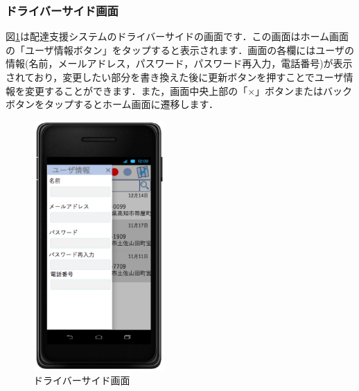 \documentclass[a4j,titlepage]{jarticle}
\begin{document}
\subsubsection{ドライバーサイド画面}
図\ref{fig:driver_side}は配達支援システムのドライバーサイドの画面です．この画面はホーム画面の「ユーザ情報ボタン」をタップすると表示されます．画面の各欄にはユーザの情報(名前，メールアドレス，パスワード，パスワード再入力，電話番号)が表示されており，変更したい部分を書き換えた後に更新ボタンを押すことでユーザ情報を変更することができます．また，画面中央上部の「×」ボタンまたはバックボタンをタップするとホーム画面に遷移します．

\begin{figure}[htbp]
 \begin{center}
  \includegraphics[width=50mm]{driver_side}
	\caption{ドライバーサイド画面}
	\label{fig:driver_side}
 \end{center}

\end{figure}
\end{document}
